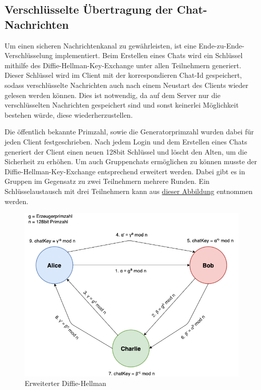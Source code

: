 \author{Troy Keßler, Michael Angermeier}
\subsection{Verschlüsselte Übertragung der Chat-Nachrichten}\label{encryption}
Um einen sicheren Nachrichtenkanal zu gewährleisten, ist eine Ende-zu-Ende-Verschlüsselung implementiert. 
Beim Erstellen eines Chats wird ein Schlüssel mithilfe des Diffie-Hellman-Key-Exchange unter allen Teilnehmern generiert.
Dieser Schlüssel wird im Client mit der korrespondieren Chat-Id gespeichert, sodass verschlüsselte Nachrichten
auch nach einem Neustart des Clients wieder gelesen werden können. Dies ist notwendig, da auf dem Server nur die verschlüsselten
Nachrichten gespeichert sind und sonst keinerlei Möglichkeit bestehen würde, diese wiederherzustellen. 

Die öffentlich bekannte Primzahl, sowie die Generatorprimzahl wurden dabei für jeden Client festgeschrieben.
Nach jedem Login und dem Erstellen eines Chats generiert der Client einen neuen 128bit Schlüssel und löscht den Alten, um die Sicherheit zu erhöhen.
Um auch Gruppenchats ermöglichen zu können musste der Diffie-Hellman-Key-Exchange entsprechend erweitert werden.
Dabei gibt es in Gruppen im Gegensatz zu zwei Teilnehmern mehrere Runden.
Ein Schlüsselaustausch mit drei Teilnehmern kann aus \hyperref[DHKE]{dieser Abbildung} entnommen werden.

\begin{figure}[h]
  \centering
  \includegraphics[width=\textwidth]{dh.png}
  
  \caption{Erweiterter Diffie-Hellman}
  \label{DHKE}
\end{figure}

